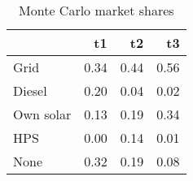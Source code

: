 \begin{table}[!ht]
	\centering
		\caption{Monte Carlo market shares}
\begin{tabular}{lrrr}
		\toprule
               &        t1&        t2&        t3\\
		\midrule
		           Grid&      0.34&      0.44&      0.56\\
		         Diesel&      0.20&      0.04&      0.02\\
		      Own solar&      0.13&      0.19&      0.34\\
		            HPS&      0.00&      0.14&      0.01\\
		           None&      0.32&      0.19&      0.08\\
		\bottomrule
	\end{tabular}
\end{table}
